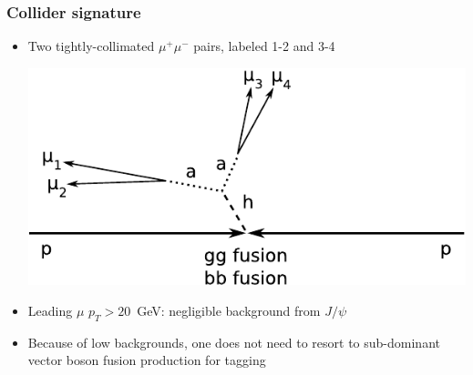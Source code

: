 \documentclass[compress]{beamer}
\begin{document}
\begin{frame}
\frametitle{Collider signature}

\begin{itemize}\setlength{\itemsep}{0.5 cm}
\item Two tightly-collimated $\mu^+\mu^-$ pairs, labeled 1-2 and 3-4

\begin{center} \includegraphics[width=0.75\linewidth]{signature.pdf} \end{center}

\item Leading $\mu$ $p_T > 20$~GeV: negligible background from $J/\psi$
\item Because of low backgrounds, one does not need to resort to sub-dominant vector boson fusion production for tagging
\end{itemize}
\end{frame}
\end{document}
